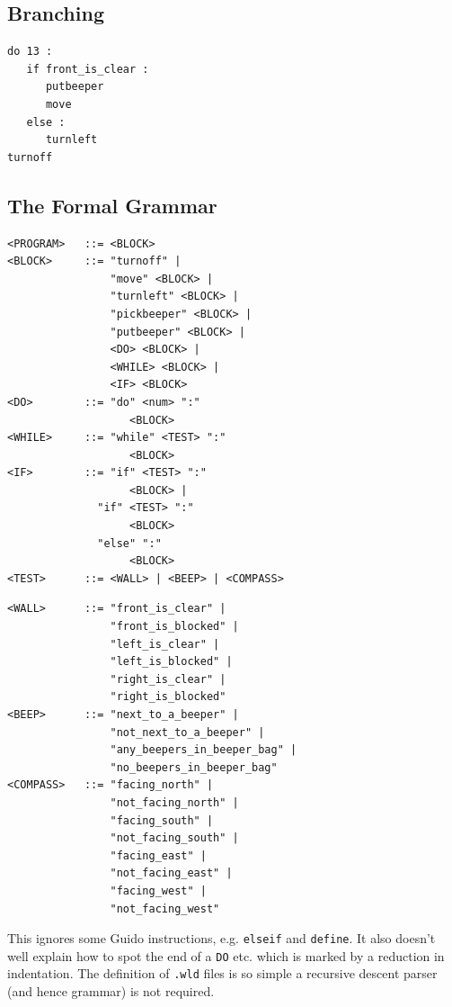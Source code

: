\subsection*{Branching}
\begin{verbatim}
do 13 :
   if front_is_clear :
      putbeeper
      move
   else :
      turnleft
turnoff
\end{verbatim}

\subsection*{The Formal Grammar}
{\small
\begin{verbatim}
<PROGRAM>   ::= <BLOCK>
<BLOCK>     ::= "turnoff" |
                "move" <BLOCK> |
                "turnleft" <BLOCK> |
                "pickbeeper" <BLOCK> |
                "putbeeper" <BLOCK> |
                <DO> <BLOCK> |
                <WHILE> <BLOCK> |
                <IF> <BLOCK>
<DO>        ::= "do" <num> ":"
                   <BLOCK>
<WHILE>     ::= "while" <TEST> ":"
                   <BLOCK>
<IF>        ::= "if" <TEST> ":"
                   <BLOCK> |
              "if" <TEST> ":"
                   <BLOCK>
              "else" ":"
                   <BLOCK>
<TEST>      ::= <WALL> | <BEEP> | <COMPASS>
\end{verbatim}
}

{\small
\begin{verbatim}
<WALL>      ::= "front_is_clear" |
                "front_is_blocked" |
                "left_is_clear" |
                "left_is_blocked" |
                "right_is_clear" |
                "right_is_blocked"
<BEEP>      ::= "next_to_a_beeper" |
                "not_next_to_a_beeper" |
                "any_beepers_in_beeper_bag" |
                "no_beepers_in_beeper_bag"
<COMPASS>   ::= "facing_north" |
                "not_facing_north" |
                "facing_south" |
                "not_facing_south" |
                "facing_east" |
                "not_facing_east" |
                "facing_west" |
                "not_facing_west"
\end{verbatim}
}

This ignores some Guido instructions, e.g. \verb^elseif^
and \verb^define^. It also doesn't well explain how to spot
the end of a \verb^DO^ etc. which is marked by a reduction in
indentation.
The definition of \verb^.wld^ files is so simple a recursive
descent parser (and hence grammar) is not required.

